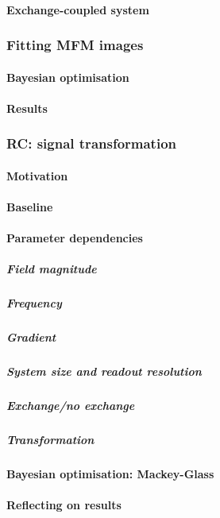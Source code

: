\paragraph{Exchange-coupled system} %
\subsubsection{Fitting MFM images}\label{sec:3:OOP:MFM}
\paragraph{Bayesian optimisation}
\paragraph{Results} %
\subsubsection{RC: signal transformation}
\paragraph{Motivation} %
\paragraph{Baseline}
\paragraph{Parameter dependencies}
\subparagraph{Field magnitude}
\subparagraph{Frequency}
\subparagraph{Gradient}
\subparagraph{System size and readout resolution}
\subparagraph{Exchange/no exchange}
\subparagraph{Transformation}
\paragraph{Bayesian optimisation: Mackey-Glass}
\paragraph{Reflecting on results} %
